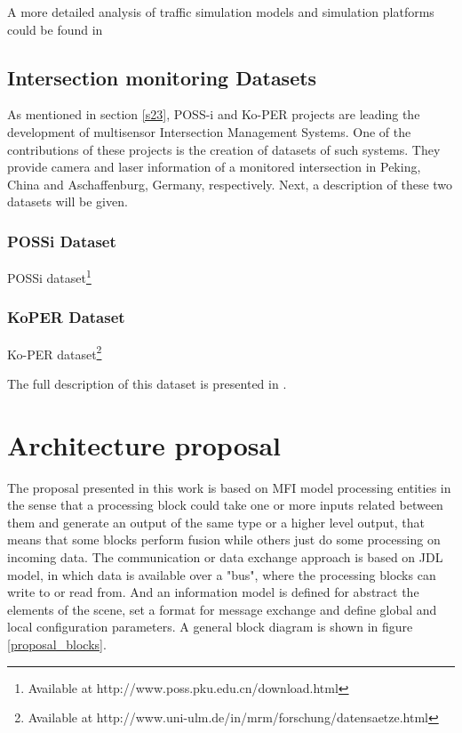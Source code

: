 
A more detailed analysis of traffic simulation models and simulation platforms could be found in \cite{AdamsBoxill2000, Barcelo2000, Kitamura2005, Lieberman1992}




\subsection{Intersection monitoring Datasets}

As mentioned in section \ref{s23}, POSS-i and Ko-PER projects are leading the development of multisensor Intersection Management Systems. One of the contributions of these projects is the creation of datasets of such systems. They provide camera and laser information of a monitored intersection in Peking, China and Aschaffenburg, Germany, respectively. Next, a description of these two datasets will be given.

\subsubsection{POSSi Dataset } \label{possi_ds}

POSSi dataset\footnote{Available at http://www.poss.pku.edu.cn/download.html}


\subsubsection{KoPER Dataset }

Ko-PER dataset\footnote{Available at http://www.uni-ulm.de/in/mrm/forschung/datensaetze.html}

The full description of this dataset is presented in \cite{Strigel2014}.

\section{Architecture proposal}

The proposal presented in this work is based on MFI model processing entities in the sense that a processing block could take one or more inputs related between them and generate an output of the same type or a higher level output, that means that some blocks perform fusion while others just do some processing on incoming data. The communication or data exchange approach is based on JDL model, in which data is available over a "bus", where the processing blocks can write to or read from. And an information model is defined for abstract the elements of the scene, set a format for message exchange and define global and local configuration parameters. A general block diagram is shown in figure \ref{proposal_blocks}.

